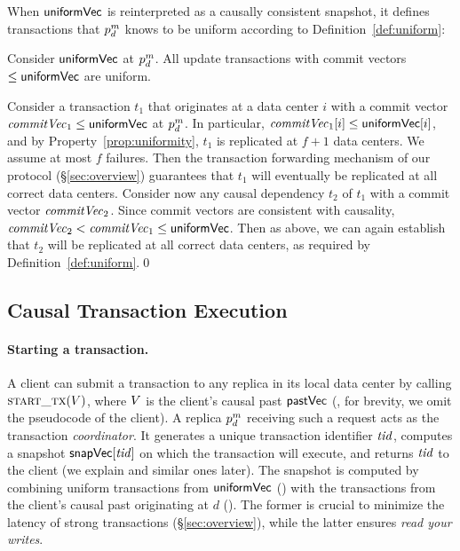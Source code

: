 When ${\sf uniformVec}$ is reinterpreted as a causally consistent snapshot, it
defines transactions that $\partition^m_d$ knows to be uniform according to
Definition~\ref{def:uniform}:
\begin{property}
\label{prop:uniformsnapshot}
Consider ${\sf uniformVec}$ at $\partition^m_d$. All update transactions with
commit vectors $\leq {\sf uniformVec}$ are uniform.
\end{property}
Consider a transaction $t_1$ that originates at a data center $i$ with a commit
vector $\commitvector_1\leq \uniformsnapshot$ at $\partition^m_d$. In
particular, $\commitvector_1[i]\leq\uniformsnapshot[i]$, and by
Property~\ref{prop:uniformity}, $t_1$ is replicated at $f+1$ data centers. We
assume at most $f$ failures. Then the transaction forwarding mechanism
of our protocol 
(\S\ref{sec:overview}) guarantees that $t_1$
will eventually be replicated at all correct data centers.
Consider now any
causal dependency $t_2$ of $t_1$ with a commit vector $\commitvector_2$. Since
commit vectors are consistent with causality,
$\commitvector_2 <\commitvector_1\leq\uniformsnapshot$. Then as above, we can
again establish that $t_2$ will be replicated at all correct data centers, as
required by Definition~\ref{def:uniform}.\qed

\subsection{Causal Transaction Execution}
\label{sec:bluetxs}

\paragraph{Starting a transaction.}
A client can submit a transaction to any replica in its local data center by
calling $\STARTTX(\avc)$, where $\avc$ is the client's causal past ${\sf pastVec}$
(, for brevity, we omit the pseudocode
of the client). A replica $\partition^m_d$ receiving such a request acts as the
transaction {\em coordinator}. It generates a unique transaction identifier
$\tx$, computes a snapshot $\vecsnapshottime[\tx]$ on which the transaction will
execute, and returns $\tx$ to the client (we explain
 and similar ones
later). The snapshot is computed by combining uniform transactions from
${\sf uniformVec}$ () with the
transactions from the client's causal past originating at $d$
(). The former is crucial to
minimize the latency of strong transactions (\S\ref{sec:overview}), while the
latter ensures \emph{read your writes}.




